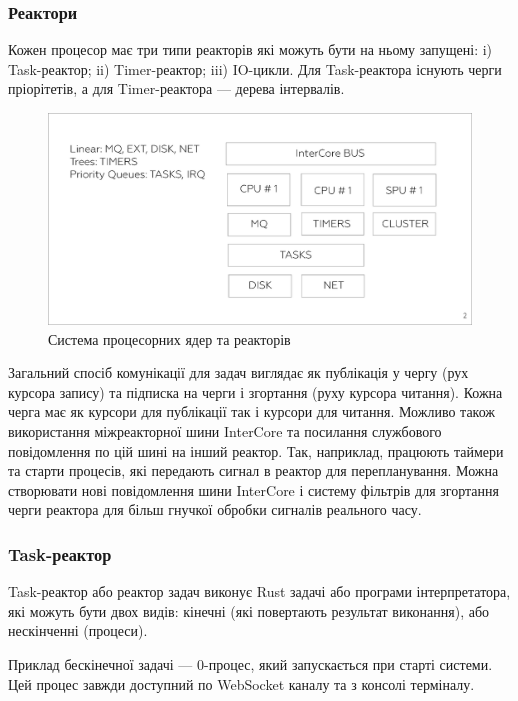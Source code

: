 \documentclass{article}
\begin{document}
\subsubsection{Реактори}
Кожен процесор має три типи реакторів які можуть бути на ньому запущені:
i) Task-реактор; ii) Timer-реактор; iii) IO-цикли. Для Task-реактора
існують черги пріорітетів, а для Timer-реактора --- дерева інтервалів.
\begin{figure}[ht]
  \captionsetup{justification=raggedright,singlelinecheck=false}
  \centerline{\includegraphics[scale=0.25]{sys.eps}}
  \caption{Система процесорних ядер та реакторів}
\end{figure}
Загальний спосіб комунікації для задач виглядає як публікація
у чергу (рух курсора запису) та підписка на черги і
згортання (руху курсора читання). Кожна черга має як
курсори для публікації так і курсори для читання. Можливо також
використання міжреакторної шини InterCore та посилання
службового повідомлення по цій шині на інший реактор. Так,
наприклад, працюють таймери та старти процесів, які передають
сигнал в реактор для перепланування. Можна створювати нові повідомлення
шини InterCore і систему фільтрів для згортання черги
реактора для більш гнучкої обробки сигналів реального часу.

\subsubsection*{Task-реактор}
Task-реактор або реактор задач виконує Rust задачі або
програми інтерпретатора, які можуть бути двох видів:
кінечні (які повертають результат виконання),
або нескінченні (процеси).

Приклад бескінечної задачі --- 0-процес,
який запускається при старті системи. Цей процес завжди доступний
по WebSocket каналу та з консолі терміналу.
\end{document}

